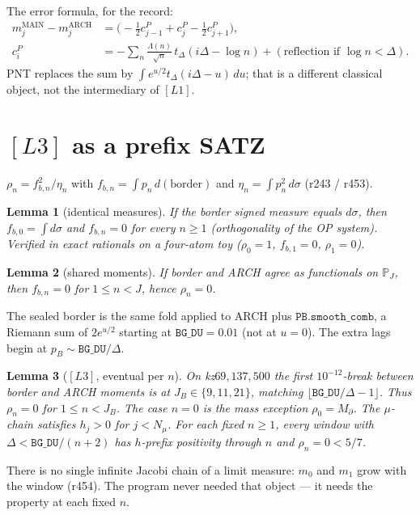 \documentclass[11pt]{article}
\newtheorem{lemma}{Lemma}
\begin{document}
The error formula, for the record:
\begin{align*}
m_j^{\mathrm{MAIN}}-m_j^{\mathrm{ARCH}}
&=\bigl(-\tfrac12 c^P_{j-1}+c^P_j-\tfrac12 c^P_{j+1}\bigr),\\
c^P_i
&=-\sum_n\frac{\Lambda(n)}{\sqrt n}\,t_\Delta(i\Delta-\log n)
  +(\text{reflection if }\log n<\Delta).
\end{align*}
PNT replaces the sum by
$\int e^{u/2}t_\Delta(i\Delta-u)\,du$;
that is a different classical object,
not the intermediary of $[L1]$.

\section{$[L3]$ as a prefix SATZ}\label{sec:L3}

$\rho_n=f_{b,n}^2/\eta_n$ with
$f_{b,n}=\int p_n\,d(\mathrm{border})$
and $\eta_n=\int p_n^2\,d\sigma$
(r243 / r453).

\begin{lemma}[identical measures]\label{lem:sympy}
If the border signed measure equals
$d\sigma$, then $f_{b,0}=\int d\sigma$
and $f_{b,n}=0$ for every $n\ge 1$
(orthogonality of the OP system).
Verified in exact rationals on a
four-atom toy ($\rho_0=1$, $f_{b,1}=0$,
$\rho_1=0$).
\end{lemma}

\begin{lemma}[shared moments]\label{lem:share}
If border and ARCH agree as functionals
on $\mathbb{P}_J$, then
$f_{b,n}=0$ for $1\le n<J$, hence
$\rho_n=0$.
\end{lemma}

The sealed border is the same fold
applied to ARCH plus
$\mathtt{PB.smooth\_comb}$, a Riemann
sum of $2e^{u/2}$ starting at
$\mathtt{BG\_DU}=0.01$
(not at $u=0$).
The extra lags begin at
$p_B\sim\mathtt{BG\_DU}/\Delta$.

\begin{lemma}[{$[L3]$, eventual per $n$}]\label{lem:L3}
On kz$69,137,500$ the first
$10^{-12}$-break between border and ARCH
moments is at $J_B\in\{9,11,21\}$,
matching $\lfloor\mathtt{BG\_DU}/\Delta-1\rfloor$.
Thus $\rho_n=0$ for $1\le n<J_B$.
The case $n=0$ is the mass exception
$\rho_0=M_\partial$.
The $\mu$-chain satisfies $h_j>0$ for
$j<N_\mu$.
For each fixed $n\ge 1$, every window
with $\Delta<\mathtt{BG\_DU}/(n+2)$
has $h$-prefix positivity through $n$
and $\rho_n=0<5/7$.
\end{lemma}

There is no single infinite Jacobi
chain of a limit measure:
$m_0$ and $m_1$ grow with the window
(r454).
The program never needed that object ---
it needs the property at each fixed $n$.
\end{document}
